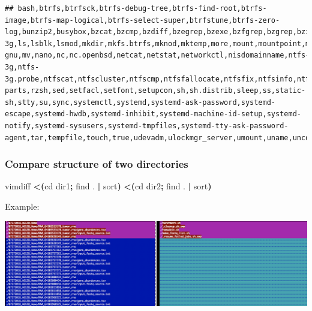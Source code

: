 \documentclass[]{book}
\newenvironment{Shaded}{\begin{snugshade}}{\end{snugshade}}
\newcommand{\BuiltInTok}[1]{#1}
\newcommand{\ExtensionTok}[1]{#1}
\newcommand{\FunctionTok}[1]{\textcolor[rgb]{0.00,0.00,0.00}{#1}}
\newcommand{\KeywordTok}[1]{\textcolor[rgb]{0.13,0.29,0.53}{\textbf{#1}}}
\newcommand{\NormalTok}[1]{#1}
\newcommand{\OperatorTok}[1]{\textcolor[rgb]{0.81,0.36,0.00}{\textbf{#1}}}
\begin{document}
\begin{verbatim}
## bash,btrfs,btrfsck,btrfs-debug-tree,btrfs-find-root,btrfs-image,btrfs-map-logical,btrfs-select-super,btrfstune,btrfs-zero-log,bunzip2,busybox,bzcat,bzcmp,bzdiff,bzegrep,bzexe,bzfgrep,bzgrep,bzip2,bzip2recover,bzless,bzmore,cat,chacl,chgrp,chmod,chown,chvt,cp,cpio,dash,date,dd,df,dir,dmesg,dnsdomainname,domainname,dumpkeys,echo,ed,egrep,false,fgconsole,fgrep,findmnt,fsck.btrfs,fuser,fusermount,getfacl,grep,gunzip,gzexe,gzip,hostname,ip,journalctl,kbd_mode,keyctl,kill,kmod,ksh,ksh93,less,lessecho,lessfile,lesskey,lesspipe,ln,loadkeys,login,loginctl,lowntfs-3g,ls,lsblk,lsmod,mkdir,mkfs.btrfs,mknod,mktemp,more,mount,mountpoint,mt,mt-gnu,mv,nano,nc,nc.openbsd,netcat,netstat,networkctl,nisdomainname,ntfs-3g,ntfs-3g.probe,ntfscat,ntfscluster,ntfscmp,ntfsfallocate,ntfsfix,ntfsinfo,ntfsls,ntfsmove,ntfsrecover,ntfssecaudit,ntfstruncate,ntfsusermap,ntfswipe,open,openvt,pidof,ping,ping4,ping6,plymouth,ps,pwd,rbash,readlink,red,rksh,rksh93,rm,rmdir,rnano,run-parts,rzsh,sed,setfacl,setfont,setupcon,sh,sh.distrib,sleep,ss,static-sh,stty,su,sync,systemctl,systemd,systemd-ask-password,systemd-escape,systemd-hwdb,systemd-inhibit,systemd-machine-id-setup,systemd-notify,systemd-sysusers,systemd-tmpfiles,systemd-tty-ask-password-agent,tar,tempfile,touch,true,udevadm,ulockmgr_server,umount,uname,uncompress,unicode_start,vdir,wdctl,which,whiptail,ypdomainname,zcat,zcmp,zdiff,zegrep,zfgrep,zforce,zgrep,zless,zmore,znew,zsh,zsh5
\end{verbatim}

\hypertarget{compare-structure-of-two-directories}{%
\subsubsection{Compare structure of two directories}\label{compare-structure-of-two-directories}}

\begin{Shaded}
\begin{Highlighting}[]
\ExtensionTok{vimdiff} \OperatorTok{<(}\BuiltInTok{cd}\NormalTok{ dir1}\KeywordTok{;} \FunctionTok{find}\NormalTok{ . }\KeywordTok{|} \FunctionTok{sort}\OperatorTok{)} \OperatorTok{<(}\BuiltInTok{cd}\NormalTok{ dir2}\KeywordTok{;} \FunctionTok{find}\NormalTok{ . }\KeywordTok{|} \FunctionTok{sort}\OperatorTok{)}
\end{Highlighting}
\end{Shaded}

Example:

\includegraphics[width=39.36in]{images/vimdiff}
\end{document}
